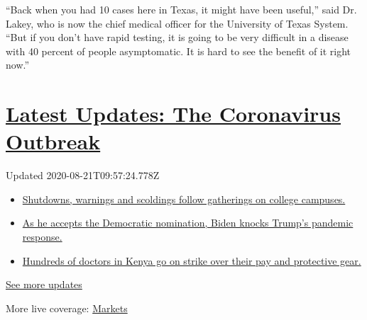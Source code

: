 ``Back when you had 10 cases here in Texas, it might have been useful,''
said Dr. Lakey, who is now the chief medical officer for the University
of Texas System. ``But if you don't have rapid testing, it is going to
be very difficult in a disease with 40 percent of people asymptomatic.
It is hard to see the benefit of it right now.''

\hypertarget{latest-updates-the-coronavirus-outbreak}{%
\section{\texorpdfstring{\href{https://www.nytimes3xbfgragh.onion/2020/08/21/world/covid-19-coronavirus.html?action=click\&pgtype=Article\&state=default\&region=MAIN_CONTENT_1\&context=storylines_live_updates}{Latest
Updates: The Coronavirus
Outbreak}}{Latest Updates: The Coronavirus Outbreak}}\label{latest-updates-the-coronavirus-outbreak}}

Updated 2020-08-21T09:57:24.778Z

\begin{itemize}
\tightlist
\item
  \href{https://www.nytimes3xbfgragh.onion/2020/08/21/world/covid-19-coronavirus.html?action=click\&pgtype=Article\&state=default\&region=MAIN_CONTENT_1\&context=storylines_live_updates\#link-4690b6aa}{Shutdowns,
  warnings and scoldings follow gatherings on college campuses.}
\item
  \href{https://www.nytimes3xbfgragh.onion/2020/08/21/world/covid-19-coronavirus.html?action=click\&pgtype=Article\&state=default\&region=MAIN_CONTENT_1\&context=storylines_live_updates\#link-324af071}{As
  he accepts the Democratic nomination, Biden knocks Trump's pandemic
  response.}
\item
  \href{https://www.nytimes3xbfgragh.onion/2020/08/21/world/covid-19-coronavirus.html?action=click\&pgtype=Article\&state=default\&region=MAIN_CONTENT_1\&context=storylines_live_updates\#link-35890b73}{Hundreds
  of doctors in Kenya go on strike over their pay and protective gear.}
\end{itemize}

\href{https://www.nytimes3xbfgragh.onion/2020/08/21/world/covid-19-coronavirus.html?action=click\&pgtype=Article\&state=default\&region=MAIN_CONTENT_1\&context=storylines_live_updates}{See
more updates}

More live coverage:
\href{https://www.nytimes3xbfgragh.onion/live/2020/08/20/business/stock-market-today-coronavirus?action=click\&pgtype=Article\&state=default\&region=MAIN_CONTENT_1\&context=storylines_live_updates}{Markets}

